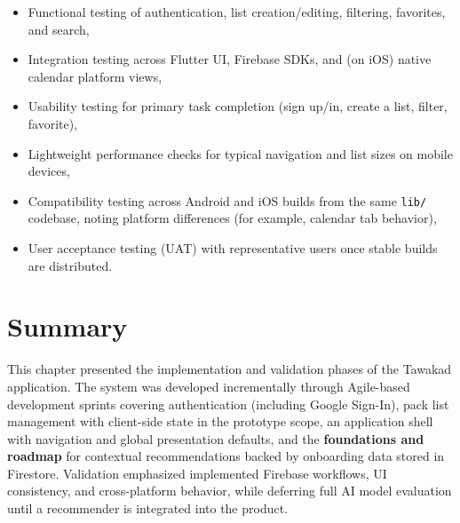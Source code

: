 \begin{itemize}
    \item Functional testing of authentication, list creation/editing, filtering, favorites, and search,
    \item Integration testing across Flutter UI, Firebase SDKs, and (on iOS) native calendar platform views,
    \item Usability testing for primary task completion (sign up/in, create a list, filter, favorite),
    \item Lightweight performance checks for typical navigation and list sizes on mobile devices,
    \item Compatibility testing across Android and iOS builds from the same \texttt{lib/} codebase, noting platform differences (for example, calendar tab behavior),
    \item User acceptance testing (UAT) with representative users once stable builds are distributed.
\end{itemize}

\section{Summary}

This chapter presented the implementation and validation phases of the Tawakad
application. The system was developed incrementally through Agile-based development sprints
covering authentication (including Google Sign-In), pack list management with client-side
state in the prototype scope, an application shell with navigation and global presentation
defaults, and the \textbf{foundations and roadmap} for contextual recommendations backed
by onboarding data stored in Firestore. Validation emphasized implemented Firebase workflows,
UI consistency, and cross-platform behavior, while deferring full AI model evaluation until
a recommender is integrated into the product.
